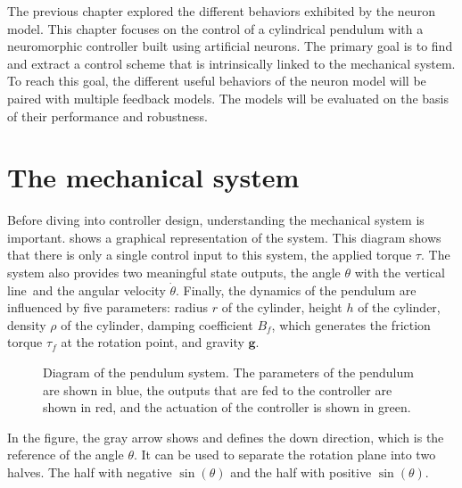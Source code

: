 \label{sec:pendulum}

The previous chapter explored the different behaviors exhibited by the neuron model.
This chapter focuses on the control of a cylindrical pendulum with a neuromorphic controller built using artificial neurons.
The primary goal is to find and extract a control scheme that is intrinsically linked to the mechanical system.
To reach this goal, the different useful behaviors of the neuron model will be paired with multiple feedback models.
The models will be evaluated on the basis of their performance and robustness.

\section{The mechanical system}

Before diving into controller design, understanding the mechanical system is important.
 shows a graphical representation of the system.
This diagram shows that there is only a single control input to this system, the applied torque $\tau$.
The system also provides two meaningful state outputs, the angle $\theta$ with the vertical line and the angular velocity $\dot{\theta}$.
Finally, the dynamics of the pendulum are influenced by five parameters: radius $r$ of the cylinder, height $h$ of the cylinder, density $\rho$ of the cylinder, damping coefficient $B_f$, which generates the friction torque $\tau_f$ at the rotation point, and gravity $\mathbf{g}$. 
\begin{figure}[!htb]
    \centering
    \caption{Diagram of the pendulum system. The parameters of the pendulum are shown in blue, the outputs that are fed to the controller are shown in red, and the actuation of the controller is shown in green.}
    \label{fig:pendulum}
\end{figure}

In the figure, the gray arrow shows and defines the down direction, which is the reference of the angle $\theta$.
It can be used to separate the rotation plane into two halves.
The half with negative $\sin\left(\theta\right)$ and the half with positive $\sin\left(\theta\right)$.

